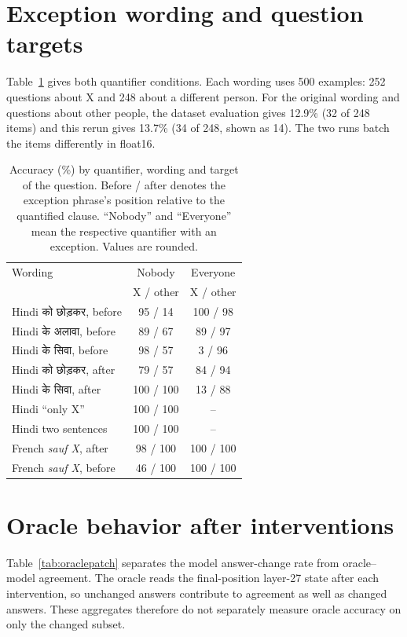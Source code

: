 \documentclass[11pt]{article}
\newcommand{\hi}[1]{{\hindifont #1}}
\begin{document}
\section{Exception wording and question targets}
\label{app:exceptions}
Table~\ref{tab:fullexceptions} gives both quantifier conditions. Each wording uses 500 examples: 252 questions about X and 248 about a different person. For the original wording and questions about other people, the dataset evaluation gives 12.9\% (32 of 248 items) and this rerun gives 13.7\% (34 of 248, shown as 14). The two runs batch the items differently in float16.

\begin{table}[t]
\small\centering
\begin{tabularx}{\linewidth}{@{}Xcc@{}}
\toprule
Wording & Nobody & Everyone \\
 & X / other & X / other \\
\midrule
Hindi \hi{को छोड़कर}, before & 95 / 14 & 100 / 98 \\
Hindi \hi{के अलावा}, before & 89 / 67 & 89 / 97 \\
Hindi \hi{के सिवा}, before & 98 / 57 & 3 / 96 \\
Hindi \hi{को छोड़कर}, after & 79 / 57 & 84 / 94 \\
Hindi \hi{के सिवा}, after & 100 / 100 & 13 / 88 \\
Hindi ``only X'' & 100 / 100 & -- \\
Hindi two sentences & 100 / 100 & -- \\
French \emph{sauf X}, after & 98 / 100 & 100 / 100 \\
French \emph{sauf X}, before & 46 / 100 & 100 / 100 \\
\bottomrule
\end{tabularx}
\caption{Accuracy (\%) by quantifier, wording and target of the question. Before / after denotes the exception phrase's position relative to the quantified clause. ``Nobody'' and ``Everyone'' mean the respective quantifier with an exception. Values are rounded.}
\label{tab:fullexceptions}
\end{table}

\section{Oracle behavior after interventions}
\label{app:oracle}
Table~\ref{tab:oraclepatch} separates the model answer-change rate from oracle--model agreement. The oracle reads the final-position layer-27 state after each intervention, so unchanged answers contribute to agreement as well as changed answers. These aggregates therefore do not separately measure oracle accuracy on only the changed subset.
\end{document}

